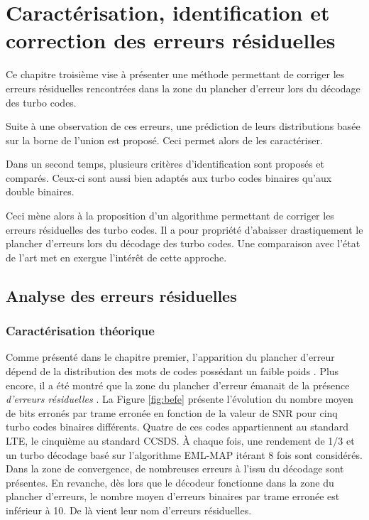 \chapter{Caractérisation, identification et correction des erreurs résiduelles} %
Ce chapitre troisième vise à présenter une méthode permettant de corriger les erreurs résiduelles rencontrées dans la zone
du plancher d'erreur lors du décodage des turbo codes.

Suite à une observation de ces erreurs, une prédiction de leurs distributions basée sur la borne de l'union est proposé. 
Ceci permet alors de les caractériser.

Dans un second temps, plusieurs critères d'identification sont proposés et comparés. Ceux-ci 
sont aussi bien adaptés aux turbo codes binaires qu'aux double binaires.

Ceci mène alors à la proposition d'un algorithme permettant de corriger les erreurs résiduelles des turbo codes.
Il a pour propriété d'abaisser drastiquement le plancher d'erreurs lors du décodage des turbo codes.
Une comparaison avec l'état de l'art met en exergue l’intérêt de cette approche.


\vspace*{\fill}
\minitocTITI
\vspace*{\fill}
\newpage

\section{Analyse des erreurs résiduelles}
\subsection{Caractérisation théorique}
Comme présenté dans le chapitre premier, l'apparition du plancher d'erreur dépend de la distribution des mots de codes 
possédant un faible poids \cite{distance_spectrum}. Plus encore, il a été montré que la zone du plancher d'erreur émanait 
de la présence \emph{d'erreurs résiduelles} \cite{takeshitaBCH}. 
La Figure \ref{fig:befe} présente l'évolution du nombre moyen de bits erronés par trame erronée en fonction de la valeur de 
SNR pour cinq turbo codes binaires différents. Quatre de ces codes appartiennent au standard LTE, le cinquième au standard CCSDS. 
À chaque fois, une rendement de 1/3 et un turbo décodage basé sur l'algorithme EML-MAP itérant 8 fois sont considérés. Dans la zone de 
convergence, de nombreuses erreurs à l'issu du décodage sont présentes. En revanche, dès lors que le décodeur 
fonctionne dans la zone du plancher d'erreurs, le nombre moyen d'erreurs binaires par trame erronée est inférieur à 10. 
De là vient leur nom d'erreurs résiduelles.

